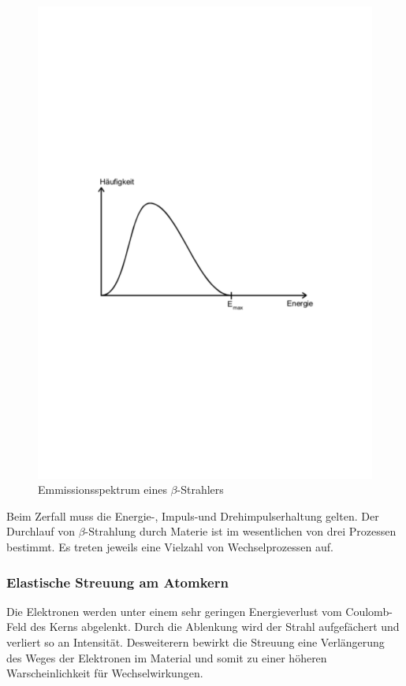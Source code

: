 \begin{figure}[h!]
  \centering
  \includegraphics[width=\textwidth]{Emiss.pdf}
  \caption{Emmissionsspektrum eines $\beta$-Strahlers \cite{1}}
  \label{fig:emiss}
\end{figure}
Beim Zerfall muss die Energie-, Impuls-und Drehimpulserhaltung gelten.
Der Durchlauf von $\beta$-Strahlung durch Materie ist im wesentlichen von drei Prozessen bestimmt. Es treten jeweils eine Vielzahl von Wechselprozessen auf.
\FloatBarrier
\subsubsection{Elastische Streuung am Atomkern}
Die Elektronen werden unter einem sehr geringen Energieverlust vom Coulomb-Feld des Kerns abgelenkt.
Durch die Ablenkung wird der Strahl aufgefächert und verliert so an Intensität.
Desweiterern bewirkt die Streuung eine Verlängerung des Weges der Elektronen im Material und somit zu einer höheren Warscheinlichkeit für Wechselwirkungen.
